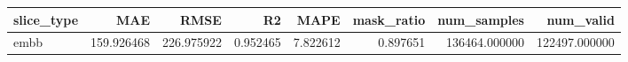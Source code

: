 \begin{tabular}{lrrrrrrr}
\toprule
slice_type & MAE & RMSE & R2 & MAPE & mask_ratio & num_samples & num_valid \\
\midrule
embb & 159.926468 & 226.975922 & 0.952465 & 7.822612 & 0.897651 & 136464.000000 & 122497.000000 \\
\bottomrule
\end{tabular}
